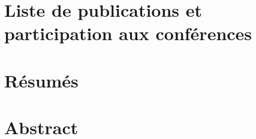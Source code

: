 \documentclass[paper=a4,fontsize=12pt,DIV=calc]{scrreprt}
\begin{document}
    
    \restoregeometry

    
  \chapter*{Liste de publications et participation aux conférences}
    
	\chapter*{Résumés}
    
  \chapter*{Abstract}
    
\end{document}
